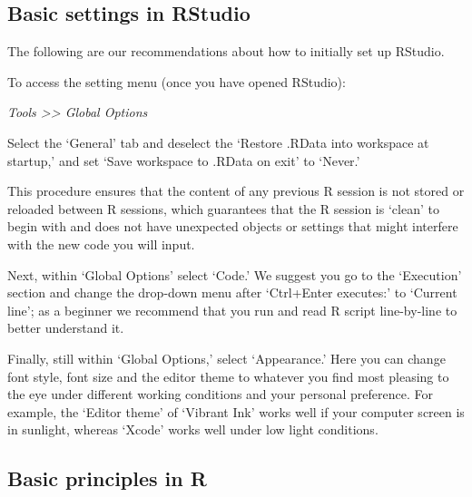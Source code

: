 \documentclass[
]{book}
\begin{document}
\hypertarget{RS-settings}{%
\subsection{Basic settings in RStudio}\label{RS-settings}}

The following are our recommendations about how to initially set up
RStudio.

To access the setting menu (once you have opened RStudio):

\emph{Tools \textgreater\textgreater{} Global Options}

Select the `General' tab and deselect the `Restore .RData into workspace
at startup,' and set `Save workspace to .RData on exit' to `Never.'

This procedure ensures that the content of any previous R session is not
stored or reloaded between R sessions, which guarantees that the R
session is `clean' to begin with and does not have unexpected objects or
settings that might interfere with the new code you will input.

Next, within `Global Options' select `Code.' We suggest you go to the
`Execution' section and change the drop-down menu after `Ctrl+Enter
executes:' to `Current line'; as a beginner we recommend that you run
and read R script line-by-line to better understand it.

Finally, still within `Global Options,' select `Appearance.' Here you
can change font style, font size and the editor theme to whatever you
find most pleasing to the eye under different working conditions and
your personal preference. For example, the `Editor theme' of `Vibrant
Ink' works well if your computer screen is in sunlight, whereas `Xcode'
works well under low light conditions.

\hypertarget{Principles}{%
\subsection{Basic principles in R}\label{Principles}}
\end{document}
